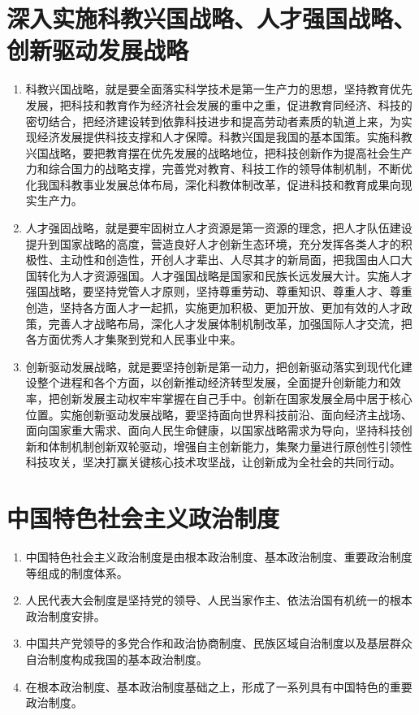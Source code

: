 \documentclass[12pt, a4paper, oneside]{ctexbook}
\begin{document}
\section{深入实施科教兴国战略、人才强国战略、创新驱动发展战略}

\begin{enumerate}
\item 科教兴国战略，就是要全面落实科学技术是第一生产力的思想，坚持教育优先发展，把科技和教育作为经济社会发展的重中之重，促进教育同经济、科技的密切结合，把经济建设转到依靠科技进步和提高劳动者素质的轨道上来，为实现经济发展提供科技支撑和人才保障。科教兴国是我国的基本国策。实施科教兴国战略，要把教育摆在优先发展的战略地位，把科技创新作为提高社会生产力和综合国力的战略支撑，完善党对教育、科技工作的领导体制机制，不断优化我国科教事业发展总体布局，深化科教体制改革，促进科技和教育成果向现实生产力。

\item 人才强固战略，就是要牢固树立人才资源是第一资源的理念，把人才队伍建设提升到国家战略的高度，营造良好人才创新生态环境，充分发挥各类人才的积极性、主动性和创造性，开创人才辈出、人尽其才的新局面，把我国由人口大国转化为人才资源强国。人才强国战略是国家和民族长远发展大计。实施人才强国战略，要坚持党管人才原则，坚持尊重劳动、尊重知识、尊重人才、尊重创造，坚持各方面人才一起抓，实施更加积极、更加开放、更加有效的人才政策，完善人才战略布局，深化人才发展体制机制改革，加强国际人才交流，把各方面优秀人才集聚到党和人民事业中来。

\item 创新驱动发展战略，就是要坚持创新是第一动力，把创新驱动落实到现代化建设整个进程和各个方面，以创新推动经济转型发展，全面提升创新能力和效率，把创新发展主动权牢牢掌握在自己手中。创新在国家发展全局中居于核心位置。实施创新驱动发展战略，要坚持面向世界科技前沿、面向经济主战场、面向国家重大需求、面向人民生命健康，以国家战略需求为导向，坚持科技创新和体制机制创新双轮驱动，增强自主创新能力，集聚力量进行原创性引领性科技攻关，坚决打赢关键核心技术攻坚战，让创新成为全社会的共同行动。
\end{enumerate}

\section{中国特色社会主义政治制度}

\begin{enumerate}
\item 中国特色社会主义政治制度是由根本政治制度、基本政治制度、重要政治制度等组成的制度体系。

\item 人民代表大会制度是坚持党的领导、人民当家作主、依法治国有机统一的根本政治制度安排。

\item 中国共产党领导的多党合作和政治协商制度、民族区域自治制度以及基层群众自治制度构成我国的基本政治制度。

\item 在根本政治制度、基本政治制度基础之上，形成了一系列具有中国特色的重要政治制度。
\end{enumerate}
\end{document}
